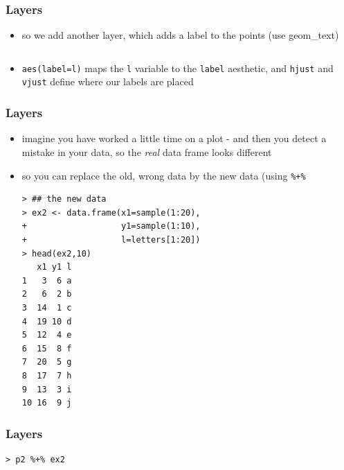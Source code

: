 \documentclass[xcolor={table},c]{beamer}
\begin{document}
\begin{frame}[fragile]\frametitle{Layers}
  \begin{itemize}
  \item so we add another layer, which adds a label to the points (use geom\_text)
\begin{verbatim}

\end{verbatim}
\item \texttt{aes(label=l)} maps the \texttt{l} variable to the \texttt{label} aesthetic, and \texttt{hjust} and \texttt{vjust} define where our labels are placed
  \end{itemize}
\begin{center}
\end{center}
\end{frame}


\begin{frame}[fragile]\frametitle{Layers}
  \begin{itemize}
  \item imagine you have worked a little time on a plot - and then you detect a mistake in your data, so the \emph{real} data frame looks different
  \item so you can replace the old, wrong data by the new  data (using \texttt{\%+\%} \footnotesize
\begin{verbatim}
> ## the new data
> ex2 <- data.frame(x1=sample(1:20),
+                   y1=sample(1:10),
+                   l=letters[1:20])
> head(ex2,10)
   x1 y1 l
1   3  6 a
2   6  2 b
3  14  1 c
4  19 10 d
5  12  4 e
6  15  8 f
7  20  5 g
8  17  7 h
9  13  3 i
10 16  9 j
\end{verbatim}
  \end{itemize}
\end{frame}


\begin{frame}[fragile]\frametitle{Layers}
\begin{verbatim}
> p2 %+% ex2
\end{verbatim}
\begin{center}
\end{center}
\end{frame}
\end{document}
